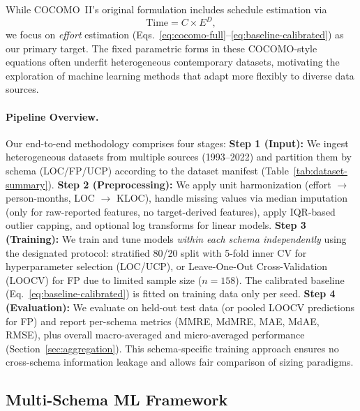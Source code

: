 \documentclass{ieeeaccess}
\begin{document}
While COCOMO~II's original formulation includes schedule estimation via
\begin{equation}
\text{Time} = C \times E^{D},
\label{eq:cocomo-time}
\end{equation}
we focus on \emph{effort} estimation (Eqs.~\ref{eq:cocomo-full}--\ref{eq:baseline-calibrated}) as our primary target. The fixed parametric forms in these COCOMO-style equations often underfit heterogeneous contemporary datasets, motivating the exploration of machine learning methods that adapt more flexibly to diverse data sources.


\paragraph{Pipeline Overview.}
Our end-to-end methodology comprises four stages:
\textbf{Step 1 (Input):} We ingest heterogeneous datasets from multiple sources (1993--2022) and partition them by schema (LOC/FP/UCP) according to the dataset manifest (Table~\ref{tab:dataset-summary}).
\textbf{Step 2 (Preprocessing):} We apply unit harmonization (effort $\to$ person-months, LOC $\to$ KLOC), handle missing values via median imputation (only for raw-reported features, no target-derived features), apply IQR-based outlier capping, and optional log transforms for linear models.
\textbf{Step 3 (Training):} We train and tune models \emph{within each schema independently} using the designated protocol: stratified 80/20 split with 5-fold inner CV for hyperparameter selection (LOC/UCP), or Leave-One-Out Cross-Validation (LOOCV) for FP due to limited sample size ($n=158$). The calibrated baseline (Eq.~\ref{eq:baseline-calibrated}) is fitted on training data only per seed.
\textbf{Step 4 (Evaluation):} We evaluate on held-out test data (or pooled LOOCV predictions for FP) and report per-schema metrics (MMRE, MdMRE, MAE, MdAE, RMSE), plus overall macro-averaged and micro-averaged performance (Section~\ref{sec:aggregation}).
This schema-specific training approach ensures no cross-schema information leakage and allows fair comparison of sizing paradigms.




\subsection{Multi-Schema ML Framework}
\end{document}
